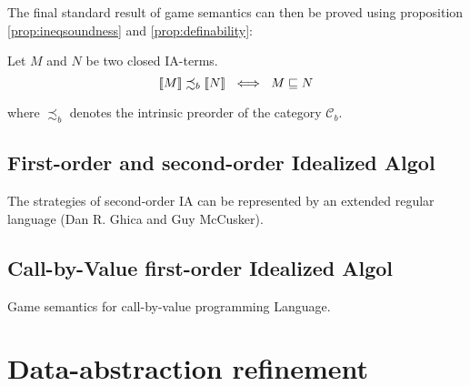The final standard result of game semantics can then be proved using proposition \ref{prop:ineqsoundness} and \ref{prop:definability}:
\begin{thm}
Let $M$ and $N$ be two closed IA-terms.
$${[\![ M ]\!]} \precsim_b {[\![ N ]\!]} \ \iff \ M \sqsubseteq N$$
\end{thm}

where $\precsim_b$ denotes the intrinsic preorder of the category $\mathcal{C}_b$.





\subsection{First-order and second-order Idealized Algol}

The strategies of second-order IA can be represented by an extended regular language
(Dan R. Ghica and Guy McCusker).

\subsection{Call-by-Value first-order Idealized Algol}

Game semantics for call-by-value programming Language.

\section{Data-abstraction refinement}


